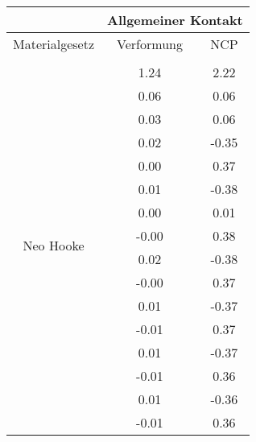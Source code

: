 \begin{table} 
\centering 
\begin{tabular}{c|cc|} 
\cline{2-3} 
 & \multicolumn{2}{|c|}{Allgemeiner Kontakt} \\ 
\hline 
\multicolumn{1}{|c|}{Materialgesetz} & \multicolumn{1}{c|}{Verformung} & \multicolumn{1}{c|}{NCP} \\ 
\hline 
\multicolumn{1}{|c|}{\multirow{101}{*}{Neo Hooke}} &\multicolumn{1}{|c|}{} & \multicolumn{1}{|c|}{} \\ 
\multicolumn{1}{|c|}{} & \multicolumn{1}{|c|}{      1.24} & \multicolumn{1}{|c|}{      2.22} \\ 
\multicolumn{1}{|c|}{} & \multicolumn{1}{|c|}{      0.06} & \multicolumn{1}{|c|}{      0.06} \\ 
\multicolumn{1}{|c|}{} & \multicolumn{1}{|c|}{      0.03} & \multicolumn{1}{|c|}{      0.06} \\ 
\multicolumn{1}{|c|}{} & \multicolumn{1}{|c|}{      0.02} & \multicolumn{1}{|c|}{     -0.35} \\ 
\multicolumn{1}{|c|}{} & \multicolumn{1}{|c|}{      0.00} & \multicolumn{1}{|c|}{      0.37} \\ 
\multicolumn{1}{|c|}{} & \multicolumn{1}{|c|}{      0.01} & \multicolumn{1}{|c|}{     -0.38} \\ 
\multicolumn{1}{|c|}{} & \multicolumn{1}{|c|}{      0.00} & \multicolumn{1}{|c|}{      0.01} \\ 
\multicolumn{1}{|c|}{} & \multicolumn{1}{|c|}{     -0.00} & \multicolumn{1}{|c|}{      0.38} \\ 
\multicolumn{1}{|c|}{} & \multicolumn{1}{|c|}{      0.02} & \multicolumn{1}{|c|}{     -0.38} \\ 
\multicolumn{1}{|c|}{} & \multicolumn{1}{|c|}{     -0.00} & \multicolumn{1}{|c|}{      0.37} \\ 
\multicolumn{1}{|c|}{} & \multicolumn{1}{|c|}{      0.01} & \multicolumn{1}{|c|}{     -0.37} \\ 
\multicolumn{1}{|c|}{} & \multicolumn{1}{|c|}{     -0.01} & \multicolumn{1}{|c|}{      0.37} \\ 
\multicolumn{1}{|c|}{} & \multicolumn{1}{|c|}{      0.01} & \multicolumn{1}{|c|}{     -0.37} \\ 
\multicolumn{1}{|c|}{} & \multicolumn{1}{|c|}{     -0.01} & \multicolumn{1}{|c|}{      0.36} \\ 
\multicolumn{1}{|c|}{} & \multicolumn{1}{|c|}{      0.01} & \multicolumn{1}{|c|}{     -0.36} \\ 
\multicolumn{1}{|c|}{} & \multicolumn{1}{|c|}{     -0.01} & \multicolumn{1}{|c|}{      0.36} \\ 

\end{tabular}
\end{table}

